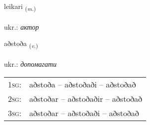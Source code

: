 \documentclass[frontgrid, backgrid]{flacards}\usepackage[]{graphicx}\usepackage[]{xcolor}
\begin{document}
\renewcommand{\flhead}{\vskip5pt \fboxsep=0pt {\small\bfseries\footnotesize Nafnorð | іменник}}
\renewcommand{\fcfoot}{\vskip5pt \fboxsep=0pt \hspace{2pt}{\small\bfseries\footnotesize 2K}}

\renewcommand{\blhead}{\vskip5pt {\small\bfseries\footnotesize Nafnorð | іменник }}
\renewcommand{\bcfoot}{\vskip5pt \hspace{2pt}{\small\bfseries\footnotesize 2K}}


{leikari \small{\textsubscript{(\textit{m.})}} \\[1ex] %
\textphonetic{[leiːkarɪ]} \\
ukr.: \emph{актор} \\  [2ex]
\renewcommand*{\arraystretch}{0.8}
}

\renewcommand{\flhead}{\vskip5pt \fboxsep=0pt {\small\bfseries\footnotesize Sagnorð | дієслово}}
\renewcommand{\fcfoot}{\vskip5pt \fboxsep=0pt \hspace{2pt}{\small\bfseries\footnotesize 2K}}

\renewcommand{\blhead}{\vskip5pt {\small\bfseries\footnotesize Sagnorð | дієслово }}
\renewcommand{\bcfoot}{\vskip5pt \hspace{2pt}{\small\bfseries\footnotesize 2K}}


{aðstoða \small{\textsubscript{(\textit{v.})}} \\[1ex] %
\textphonetic{[aðstɔða]} \\
ukr.: \emph{допомагати} \\  [2ex]
\renewcommand*{\arraystretch}{0.8}
\begin{tabular}{p{1cm}l}
\textsc{1sg}: & aðstoða -- aðstoðaði -- aðstoðað \\ 
\textsc{2sg}: & aðstoðar -- aðstoðaðir -- aðstoðað \\ 
\textsc{3sg}: & aðstoðar -- aðstoðaði -- aðstoðað \\ 
\end{tabular}
}
\end{document}
